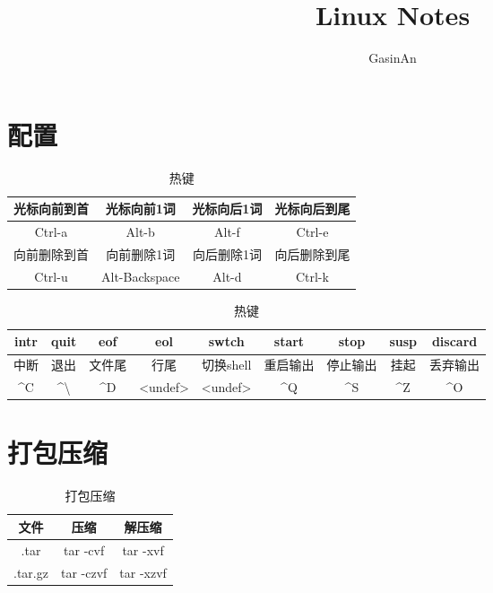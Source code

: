 \documentclass[12pt]{ctexart}
\title{Linux Notes}
\author{GasinAn}
\theoremstyle{definition}
\begin{document}
    \maketitle

    \tableofcontents

    \section{配置}

    \begin{table}[htbp]
        \centering
        \begin{tabular}{|c|c|c|c|}
            \hline
            光标向前到首 & 光标向前1词 & 光标向后1词 & 光标向后到尾 \\
            \hline
            Ctrl-a & Alt-b & Alt-f & Ctrl-e\\
            \hline
            向前删除到首 & 向前删除1词 & 向后删除1词 & 向后删除到尾 \\
            \hline
            Ctrl-u & Alt-Backspace & Alt-d & Ctrl-k\\
            \hline
        \end{tabular}
        \caption{热键}
    \end{table}

    \begin{table}[htbp]
        \centering
        \begin{tabular}{|c|c|c|c|c|c|c|c|c|}
            \hline
            intr & quit & eof & eol & swtch & start & stop & susp & discard \\
            \hline
            中断 & 退出 & 文件尾 & 行尾 & 切换shell & 重启输出 & 停止输出 & 挂起 & 丢弃输出 \\
            \hline
            \^{}C & \^{}\textbackslash & \^{}D & <undef> & <undef> & \^{}Q & \^{}S & \^{}Z & \^{}O \\
            \hline
        \end{tabular}
        \caption{热键}
    \end{table}

    \section{打包压缩}

    \begin{table}[htbp]
        \centering
        \begin{tabular}{|c|c|c|}
            \hline
            文件 & 压缩 & 解压缩\\
            \hline
            .tar & tar -cvf & tar -xvf\\
            \hline
            .tar.gz & tar -czvf & tar -xzvf\\
            \hline
        \end{tabular}
        \caption{打包压缩}
    \end{table}
\end{document}
